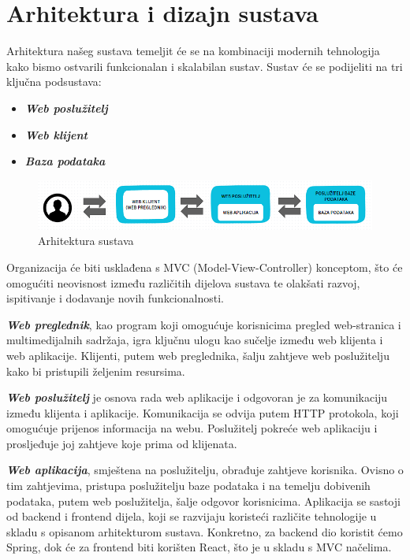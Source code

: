\chapter{Arhitektura i dizajn sustava}
		
	Arhitektura našeg sustava temeljit će se na kombinaciji modernih tehnologija kako bismo ostvarili funkcionalan i skalabilan sustav. Sustav će se podijeliti na tri ključna podsustava: 
	\begin{itemize}
		\item 	\textit{\textbf{Web poslužitelj}}		
		\item 	\textit{\textbf{Web klijent}}	
		\item 	\textit{\textbf{Baza podataka}}
	\end{itemize}
	
	\begin{figure}[H]
		\includegraphics[scale=0.75]{slike/skica arh.png} %
		\centering
		\caption{Arhitektura sustava}
		\label{fig:promjene}
	\end{figure}
	
	Organizacija će biti usklađena s MVC (Model-View-Controller) konceptom, što će omogućiti neovisnost između različitih dijelova sustava te olakšati razvoj, ispitivanje i dodavanje novih funkcionalnosti.
	
	\textit{\textbf{Web preglednik}}, kao program koji omogućuje korisnicima pregled web-stranica i multimedijalnih sadržaja, igra ključnu ulogu kao sučelje između web klijenta i web aplikacije. Klijenti, putem web preglednika, šalju zahtjeve web poslužitelju kako bi pristupili željenim resursima.
	
	\textit{\textbf{Web poslužitelj}} je osnova rada web aplikacije i odgovoran je za komunikaciju između klijenta i aplikacije. Komunikacija se odvija putem HTTP protokola, koji omogućuje prijenos informacija na webu. Poslužitelj pokreće web aplikaciju i prosljeđuje joj zahtjeve koje prima od klijenata.	

	\textit{\textbf{Web aplikacija}}, smještena na poslužitelju, obrađuje zahtjeve korisnika. Ovisno o tim zahtjevima, pristupa poslužitelju baze podataka i na temelju dobivenih podataka, putem web poslužitelja, šalje odgovor korisnicima. Aplikacija se sastoji od backend i frontend dijela, koji se razvijaju koristeći različite tehnologije u skladu s opisanom arhitekturom sustava. Konkretno, za backend dio koristit ćemo Spring, dok će za frontend biti korišten React, što je u skladu s MVC načelima.
		
